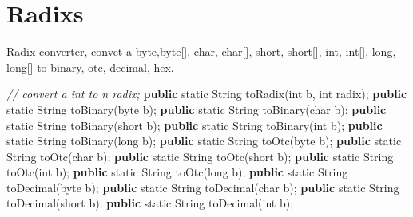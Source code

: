 \documentclass[
]{book}
\newenvironment{Shaded}{\begin{snugshade}}{\end{snugshade}}
\newcommand{\BuiltInTok}[1]{#1}
\newcommand{\CommentTok}[1]{\textcolor[rgb]{0.56,0.35,0.01}{\textit{#1}}}
\newcommand{\DataTypeTok}[1]{\textcolor[rgb]{0.13,0.29,0.53}{#1}}
\newcommand{\FunctionTok}[1]{\textcolor[rgb]{0.00,0.00,0.00}{#1}}
\newcommand{\KeywordTok}[1]{\textcolor[rgb]{0.13,0.29,0.53}{\textbf{#1}}}
\newcommand{\NormalTok}[1]{#1}
\begin{document}
\hypertarget{langx-java_references_utils_Radixs}{%
\section{Radixs}\label{langx-java_references_utils_Radixs}}

Radix converter, convet a byte,byte{[}{]}, char, char{[}{]}, short, short{[}{]}, int, int{[}{]}, long, long{[}{]} to binary, otc, decimal, hex.

\begin{Shaded}
\begin{Highlighting}[]
\CommentTok{// convert a int to n radix;}
\KeywordTok{public} \DataTypeTok{static} \BuiltInTok{String} \FunctionTok{toRadix}\NormalTok{(}\DataTypeTok{int}\NormalTok{ b, }\DataTypeTok{int}\NormalTok{ radix);}
\KeywordTok{public} \DataTypeTok{static} \BuiltInTok{String} \FunctionTok{toBinary}\NormalTok{(}\DataTypeTok{byte}\NormalTok{ b);}
\KeywordTok{public} \DataTypeTok{static} \BuiltInTok{String} \FunctionTok{toBinary}\NormalTok{(}\DataTypeTok{char}\NormalTok{ b);}
\KeywordTok{public} \DataTypeTok{static} \BuiltInTok{String} \FunctionTok{toBinary}\NormalTok{(}\DataTypeTok{short}\NormalTok{ b);}
\KeywordTok{public} \DataTypeTok{static} \BuiltInTok{String} \FunctionTok{toBinary}\NormalTok{(}\DataTypeTok{int}\NormalTok{ b);}
\KeywordTok{public} \DataTypeTok{static} \BuiltInTok{String} \FunctionTok{toBinary}\NormalTok{(}\DataTypeTok{long}\NormalTok{ b);}
\KeywordTok{public} \DataTypeTok{static} \BuiltInTok{String} \FunctionTok{toOtc}\NormalTok{(}\DataTypeTok{byte}\NormalTok{ b);}
\KeywordTok{public} \DataTypeTok{static} \BuiltInTok{String} \FunctionTok{toOtc}\NormalTok{(}\DataTypeTok{char}\NormalTok{ b);}
\KeywordTok{public} \DataTypeTok{static} \BuiltInTok{String} \FunctionTok{toOtc}\NormalTok{(}\DataTypeTok{short}\NormalTok{ b);}
\KeywordTok{public} \DataTypeTok{static} \BuiltInTok{String} \FunctionTok{toOtc}\NormalTok{(}\DataTypeTok{int}\NormalTok{ b);}
\KeywordTok{public} \DataTypeTok{static} \BuiltInTok{String} \FunctionTok{toOtc}\NormalTok{(}\DataTypeTok{long}\NormalTok{ b);}
\KeywordTok{public} \DataTypeTok{static} \BuiltInTok{String} \FunctionTok{toDecimal}\NormalTok{(}\DataTypeTok{byte}\NormalTok{ b);}
\KeywordTok{public} \DataTypeTok{static} \BuiltInTok{String} \FunctionTok{toDecimal}\NormalTok{(}\DataTypeTok{char}\NormalTok{ b);}
\KeywordTok{public} \DataTypeTok{static} \BuiltInTok{String} \FunctionTok{toDecimal}\NormalTok{(}\DataTypeTok{short}\NormalTok{ b);}
\KeywordTok{public} \DataTypeTok{static} \BuiltInTok{String} \FunctionTok{toDecimal}\NormalTok{(}\DataTypeTok{int}\NormalTok{ b);}

\end{Highlighting}
\end{Shaded}
\end{document}
